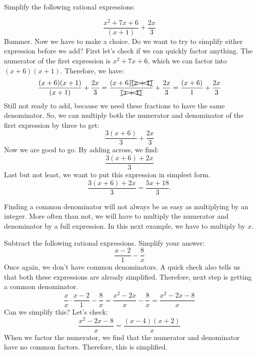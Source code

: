 \begin{example}
Simplify the following rational expressions:

\[
\frac{x^2+7x+6}{(x+1)}+\frac{2x}{3}
\]	
Bummer. Now we have to make a choice. Do we want to try to simplify either expression before we add? First let's check if we can quickly factor anything. The numerator of the first expression is $x^2+7x+6$, which we can factor into $(x+6)(x+1)$. Therefore, we have:
\[
\frac{(x+6)(x+1)}{(x+1)}+\frac{2x}{3}=\frac{(x+6)\xcancel{(x+1)}}{\xcancel{(x+1)}}+\frac{2x}{3}=\frac{(x+6)}{1}+\frac{2x}{3}
\]
Still not ready to add, because we need these fractions to have the same denominator. So, we can multiply both the numerator and denominator of the first expression by three to get:
\[
\frac{3(x+6)}{3}+ \frac{2x}{3}
\]
Now we are good to go. By adding across, we find:
\[
\frac{3(x+6)+2x}{3}
\]
Last but not least, we want to put this expression in simplest form.
\[
\frac{3(x+6)+2x}{3}=\frac{5x+18}{3}.
\]
\end{example}

Finding a common denominator will not always be as easy as multiplying by an integer. More often than not, we will have to multiply the numerator and denominator by a full expression. In this next example, we have to multiply by $x$.

\begin{example}[Subtraction]
Subtract the following rational expressions. Simplify your answer:
\[
\frac{x-2}{1}-\frac{8}{x}
\]	
Once again, we don't have common denominators. A quick check also tells us that both these expressions are already simplified. Therefore, next step is getting a common denominator.
\[
\frac{x}{x} \cdot \frac{x-2}{1} -\frac{8}{x} = \frac{x^2 -2x}{x}-\frac{8}{x}=\frac{x^2-2x-8}{x}
\]
Can we simplify this? Let's check:
\[
\frac{x^2-2x-8}{x}=\frac{(x-4)(x+2)}{x}
\]
When we factor the numerator, we find that the numerator and denominator have no common factors. Therefore, this is simplified. 
\end{example}



